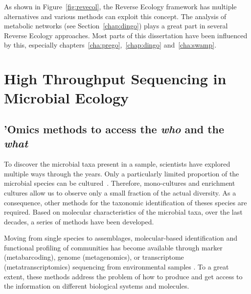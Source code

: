       As shown in Figure~\ref{fig:revecol}, the Reverse Ecology framework 
      has multiple alternatives and various methods can exploit this concept.
      The analysis of metabolic networks (see Section~\ref{chap:dingo}) 
      plays a great part in several Reverse Ecology approaches.
      Most parts of this dissertation have been influenced by this, especially 
      chapters~\ref{cha:prego},~\ref{chap:dingo} and~\ref{cha:swamp}.
      



\section{High Throughput Sequencing in Microbial Ecology}

   \subsection{'Omics methods to access the \textit{who} and the \textit{what}}
   \label{subsec:omics}
      To discover the microbial taxa present in a sample, scientists have 
      explored multiple ways through the years. 
      Only a particularly limited proportion of the microbial species 
      can be cultured~\citep{steen2019high}.
      Therefore, mono-cultures and enrichment cultures allow us to observe 
      only a small fraction of the actual diversity. 
      As a consequence, other methods for the taxonomic identification of theses
      species are required.
      Based on molecular characteristics of the microbial taxa, 
      over the last decades, a series of methods have been developed. 
 
      Moving from single species to assemblages, molecular-based identification and functional 
      profiling of communities has become available through marker (metabarcoding), 
      genome (metagenomics), or transcriptome (metatranscriptomics) sequencing from environmental 
      samples \citep{goldford2018emergent}. 
      To a great extent, these methods address the problem of how to produce and get access 
      to the information on different biological systems and molecules.

